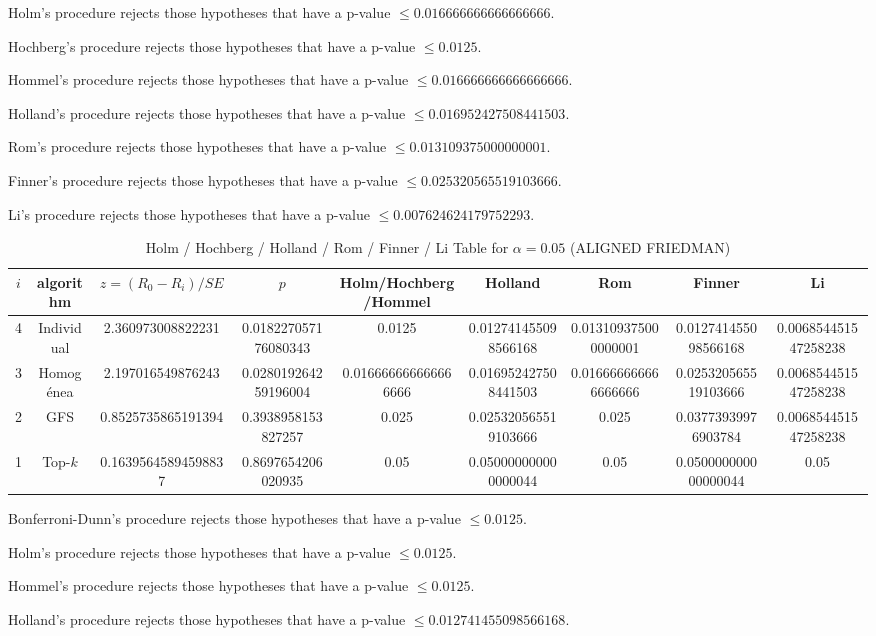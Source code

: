 \documentclass[a4paper,10pt]{article}
\begin{document}
\begin{landscape}
Holm's procedure rejects those hypotheses that have a p-value $\le0.016666666666666666$.


Hochberg's procedure rejects those hypotheses that have a p-value $\le0.0125$.


Hommel's procedure rejects those hypotheses that have a p-value $\le0.016666666666666666$.


Holland's procedure rejects those hypotheses that have a p-value $\le0.016952427508441503$.


Rom's procedure rejects those hypotheses that have a p-value $\le0.013109375000000001$.


Finner's procedure rejects those hypotheses that have a p-value $\le0.025320565519103666$.


Li's procedure rejects those hypotheses that have a p-value $\le0.007624624179752293$.



\newpage

\begin{table}[!htp]
\centering\scriptsize
\caption{Holm / Hochberg / Holland / Rom / Finner / Li Table for $\alpha=0.05$ (ALIGNED FRIEDMAN)}
\begin{tabular}{ccccccccc}
$i$&algorithm&$z=(R_0 - R_i)/SE$&$p$&Holm/Hochberg/Hommel&Holland&Rom&Finner&Li\\
\hline
4&Individual&2.360973008822231&0.018227057176080343&0.0125&0.012741455098566168&0.013109375000000001&0.012741455098566168&0.006854451547258238\\
3&Homogénea&2.197016549876243&0.028019264259196004&0.016666666666666666&0.016952427508441503&0.016666666666666666&0.025320565519103666&0.006854451547258238\\
2&GFS&0.8525735865191394&0.3938958153827257&0.025&0.025320565519103666&0.025&0.03773939976903784&0.006854451547258238\\
1&Top-$k$&0.16395645894598837&0.8697654206020935&0.05&0.050000000000000044&0.05&0.050000000000000044&0.05\\
\hline
\end{tabular}
\end{table}
Bonferroni-Dunn's procedure rejects those hypotheses that have a p-value $\le0.0125$.


Holm's procedure rejects those hypotheses that have a p-value $\le0.0125$.


Hommel's procedure rejects those hypotheses that have a p-value $\le0.0125$.


Holland's procedure rejects those hypotheses that have a p-value $\le0.012741455098566168$.



\end{landscape}
\end{document}
